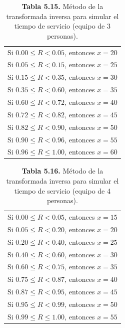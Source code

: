 \documentclass[11pt,letterpaper]{report}
\begin{document}
\begin{table}[H]
\centering
\caption*{\textbf{Tabla 5.15.} Método de la transformada inversa para simular el tiempo de servicio (equipo de 3 personas).}
\begin{tabular}{l}
Si $0.00 \le R < 0.05$, entonces $x=20$ \\
Si $0.05 \le R < 0.15$, entonces $x=25$ \\
Si $0.15 \le R < 0.35$, entonces $x=30$ \\
Si $0.35 \le R < 0.60$, entonces $x=35$ \\
Si $0.60 \le R < 0.72$, entonces $x=40$ \\
Si $0.72 \le R < 0.82$, entonces $x=45$ \\
Si $0.82 \le R < 0.90$, entonces $x=50$ \\
Si $0.90 \le R < 0.96$, entonces $x=55$ \\
Si $0.96 \le R \le 1.00$, entonces $x=60$ \\
\end{tabular}
\end{table}

\begin{table}[H]
\centering
\caption*{\textbf{Tabla 5.16.} Método de la transformada inversa para simular el tiempo de servicio (equipo de 4 personas).}
\begin{tabular}{l}
Si $0.00 \le R < 0.05$, entonces $x=15$ \\
Si $0.05 \le R < 0.20$, entonces $x=20$ \\
Si $0.20 \le R < 0.40$, entonces $x=25$ \\
Si $0.40 \le R < 0.60$, entonces $x=30$ \\
Si $0.60 \le R < 0.75$, entonces $x=35$ \\
Si $0.75 \le R < 0.87$, entonces $x=40$ \\
Si $0.87 \le R < 0.95$, entonces $x=45$ \\
Si $0.95 \le R < 0.99$, entonces $x=50$ \\
Si $0.99 \le R \le 1.00$, entonces $x=55$ \\
\end{tabular}
\end{table}
\end{document}
